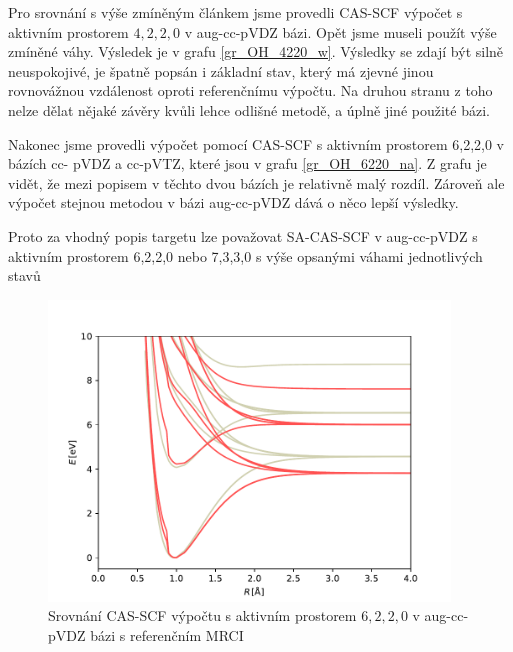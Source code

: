 Pro srovnání s výše zmíněným článkem jsme provedli CAS-SCF výpočet s aktivním prostorem 
$4,2,2,0$ v aug-cc-pVDZ bázi. Opět jsme museli použít výše zmíněné váhy.
Výsledek je v grafu \ref{gr_OH_4220_w}. Výsledky se zdají být silně neuspokojivé, je 
špatně popsán i základní stav, který má zjevné jinou rovnovážnou vzdálenost oproti 
referenčnímu výpočtu. Na druhou stranu z toho nelze dělat nějaké závěry kvůli lehce 
odlišné metodě, a úplně jiné použité bázi.

Nakonec jsme provedli výpočet pomocí CAS-SCF s aktivním prostorem 6,2,2,0 v bázích cc-
pVDZ a cc-pVTZ, které jsou v grafu \ref{gr_OH_6220_na}. Z grafu je vidět, že mezi 
popisem v těchto dvou bázích je relativně malý rozdíl. Zároveň ale výpočet stejnou 
metodou  v bázi aug-cc-pVDZ dává o něco lepší výsledky.

Proto za vhodný popis targetu lze považovat SA-CAS-SCF v aug-cc-pVDZ s aktivním 
prostorem 6,2,2,0 nebo 7,3,3,0 s výše opsanými váhami jednotlivých stavů

\begin{figure}
\centering
\includegraphics[width=0.95\textwidth]{../img/OH-MULTI-DZ-6220.pdf}
\caption{Srovnání CAS-SCF výpočtu s aktivním prostorem $6,2,2,0$ v aug-cc-pVDZ bázi 
s referenčním MRCI}
\label{gr_OH_6220}
\end{figure}

